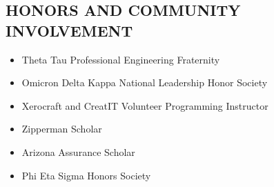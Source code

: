 \documentclass{res}
\begin{document}
\begin{resume}
\section{HONORS AND COMMUNITY INVOLVEMENT}
  \begin{itemize} \itemsep -2pt %
    \item Theta Tau Professional Engineering Fraternity
    \item Omicron Delta Kappa National Leadership Honor Society
    \item Xerocraft and CreatIT Volunteer Programming Instructor
    \item Zipperman Scholar
    \item Arizona Assurance Scholar
    \item Phi Eta Sigma Honors Society
  \end{itemize}


\end{resume}
\end{document}
